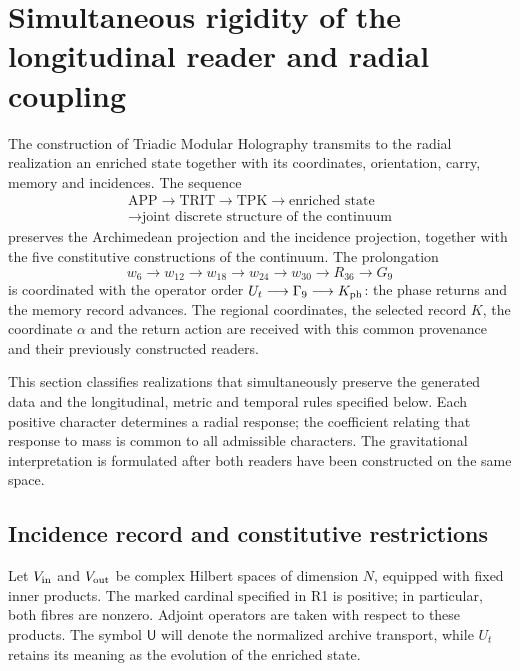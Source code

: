 \section{Simultaneous rigidity of the longitudinal reader and radial coupling}
\label{g26:sec:rigidez-radial-en}

The construction of Triadic Modular Holography transmits to the radial
realization an enriched state together with its coordinates, orientation,
carry, memory and incidences. The sequence
\[
 \begin{gathered}
 \mathrm{APP}\longrightarrow\mathrm{TRIT}\longrightarrow\mathrm{TPK}
 \longrightarrow\text{enriched state}\\
 \longrightarrow\text{joint discrete structure of the continuum}
 \end{gathered}
\]
preserves the Archimedean projection and the incidence projection,
together with the five constitutive constructions of the continuum.
The prolongation
\[
 w_6\longrightarrow w_{12}\longrightarrow w_{18}\longrightarrow
 w_{24}\longrightarrow w_{30}\longrightarrow R_{36}\longrightarrow G_9
\]
is coordinated with the operator order
\(U_t\longrightarrow\Gamma_9\longrightarrow K_{\rm ph}\): the phase
returns and the memory record advances. The regional coordinates, the
selected record \(K\), the coordinate \(\alpha\) and the return action
are received with this common provenance and their previously constructed
readers.

This section classifies realizations that simultaneously preserve the
generated data and the longitudinal, metric and temporal rules specified
below. Each positive character determines a radial response; the
coefficient relating that response to mass is common to all admissible
characters. The gravitational interpretation is formulated after both
readers have been constructed on the same space.

\subsection{Incidence record and constitutive restrictions}

Let \(V_{\rm in}\) and \(V_{\rm out}\) be complex Hilbert spaces
of dimension \(N\), equipped with fixed inner products. The marked cardinal
specified in R1 is positive; in particular, both fibres are nonzero. Adjoint operators
are taken with respect to these products. The symbol \(\mathsf U\)
will denote the normalized archive transport, while \(U_t\) retains
its meaning as the evolution of the enriched state.

